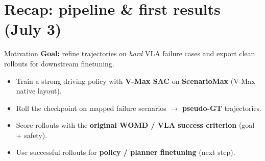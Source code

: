 \section{Recap: pipeline \& first results (July 3)}

\begin{frame}{Motivation}
  \textbf{Goal:} refine trajectories on \emph{hard} VLA failure cases and export clean rollouts for downstream finetuning.

  \vspace{0.6em}
  \begin{itemize}
    \item Train a strong driving policy with \textbf{V-Max SAC} on \textbf{ScenarioMax} (V-Max native layout).
    \item Roll the checkpoint on mapped failure scenarios $\rightarrow$ \textbf{pseudo-GT} trajectories.
    \item Score rollouts with the \textbf{original WOMD / VLA success criterion} (goal + safety).
    \item Use successful rollouts for \textbf{policy / planner finetuning} (next step).
  \end{itemize}
\end{frame}

